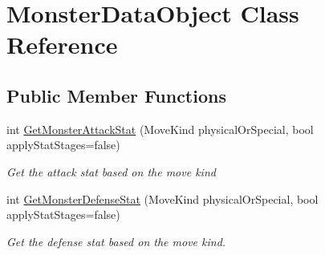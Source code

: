 \hypertarget{class_monster_data_object}{\section{Monster\-Data\-Object Class Reference}
\label{class_monster_data_object}
}
\subsection*{Public Member Functions}
\begin{DoxyCompactItemize}
\item 
int \hyperlink{class_monster_data_object_a6dd85baaa39abaac720a36b71db7536e}{Get\-Monster\-Attack\-Stat} (Move\-Kind physical\-Or\-Special, bool apply\-Stat\-Stages=false)
\begin{DoxyCompactList}\small\item\em Get the attack stat based on the move kind \end{DoxyCompactList}\item 
int \hyperlink{class_monster_data_object_a1eda550eeb621625d872b66b1c27eba7}{Get\-Monster\-Defense\-Stat} (Move\-Kind physical\-Or\-Special, bool apply\-Stat\-Stages=false)
\begin{DoxyCompactList}\small\item\em Get the defense stat based on the move kind. \end{DoxyCompactList}\end{DoxyCompactItemize}
